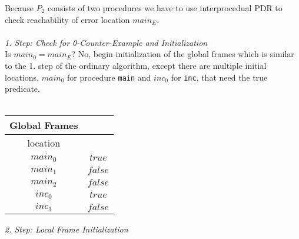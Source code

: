 \documentclass{article}
\begin{document}
	Because $P_2$ consists of two procedures we have to use interprocedual PDR to check reachability of error location $main_E$. \\ \\
	
	\textsl{1. Step: Check for 0-Counter-Example and Initialization} \\
	Is $main_0 = main_E$? No, begin initialization of the global frames which is similar to the 1. step of the ordinary algorithm, except there are multiple initial locations, $main_0$ for procedure \texttt{main} and $inc_0$ for \texttt{inc}, that need the true predicate. \\ \\
	
	\setlength\tabcolsep{0.35em}
	\begin{center}
		\begin{tabu}{cc}
			Global Frames \\
			\toprule
			location &  \\
			$main_0$ & $true$ \\
			$main_1$ & $false$ \\
			$main_2$ & $false$ \\
			$inc_0$ & $true$ \\
			$inc_1$ & $false$\\
			\bottomrule
		\end{tabu}
	\end{center}
	
	\vspace*{1em}
	\textsl{2. Step: Local Frame Initialization} \\
	
\end{document}
